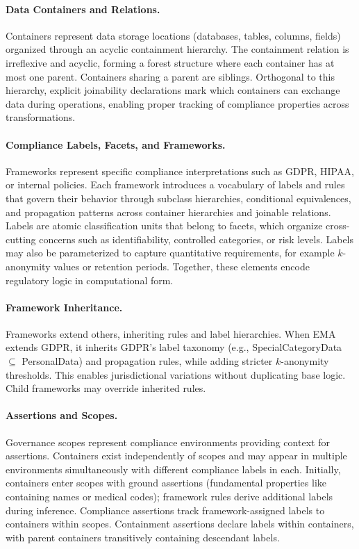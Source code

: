 \documentclass{IOS-Book-Article}
\begin{document}
\paragraph{Data Containers and Relations.}
Containers represent data storage locations (databases, tables, columns, fields) organized through an acyclic containment hierarchy. The containment relation is irreflexive and acyclic, forming a forest structure where each container has at most one parent. Containers sharing a parent are siblings. Orthogonal to this hierarchy, explicit joinability declarations mark which containers can exchange data during operations, enabling proper tracking of compliance properties across transformations.

\paragraph{Compliance Labels, Facets, and Frameworks.}
Frameworks represent specific compliance interpretations such as GDPR, HIPAA, or internal policies. Each framework introduces a vocabulary of labels and rules that govern their behavior through subclass hierarchies, conditional equivalences, and propagation patterns across container hierarchies and joinable relations. Labels are atomic classification units that belong to facets, which organize cross-cutting concerns such as identifiability, controlled categories, or risk levels. Labels may also be parameterized to capture quantitative requirements, for example $k$-anonymity values or retention periods. Together, these elements encode regulatory logic in computational form.

\paragraph{Framework Inheritance.}
Frameworks extend others, inheriting rules and label hierarchies. When EMA extends GDPR, it inherits GDPR's label taxonomy (e.g., SpecialCategoryData $\subseteq$ PersonalData) and propagation rules, while adding stricter $k$-anonymity thresholds. This enables jurisdictional variations without duplicating base logic. Child frameworks may override inherited rules.

\paragraph{Assertions and Scopes.}
Governance scopes represent compliance environments providing context for assertions. Containers exist independently of scopes and may appear in multiple environments simultaneously with different compliance labels in each. Initially, containers enter scopes with ground assertions (fundamental properties like containing names or medical codes); framework rules derive additional labels during inference. Compliance assertions track framework-assigned labels to containers within scopes. Containment assertions declare labels within containers, with parent containers transitively containing descendant labels.
\end{document}
